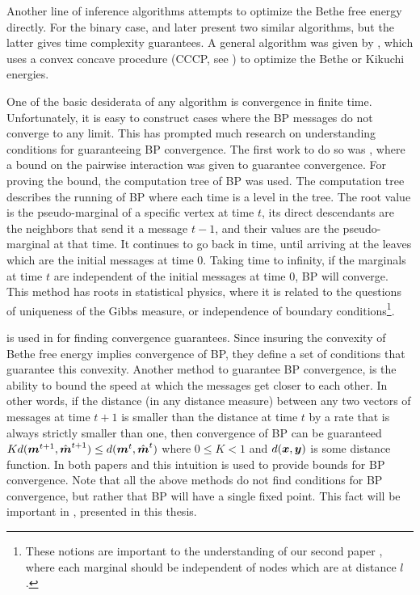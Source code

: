 Another line of inference algorithms attempts to optimize the Bethe free energy directly.
For the binary case,  \cite{welling2001belief} and later  \cite{shin2012complexity} present two similar algorithms, but the latter gives time complexity guarantees. A general algorithm was given by  \cite{yuille2002cccp}, which uses a convex concave procedure (CCCP, see  \cite{yuille2002concave}) to optimize the Bethe or Kikuchi energies.

One of the basic desiderata of any algorithm is convergence in finite time. Unfortunately, it is easy to construct cases where the
BP messages do not converge to any limit. This has prompted much research on understanding conditions for guaranteeing BP convergence.
The first work to do so was  \cite{tatikonda2002loopy}, where a bound on the pairwise interaction was given to guarantee convergence.
For proving the bound, the computation tree of BP was used.
The computation tree describes the running of BP where each time is a level in the tree.
The root value is the pseudo-marginal of a specific vertex at time $t$, its direct descendants are the neighbors that send it a message $t-1$, and their values are the pseudo-marginal at that time.
It continues to go back in time, until arriving at the leaves which are the initial messages at time $0$.
Taking time to infinity, if the marginals at time $t$ are independent of the initial messages at time $0$, BP will converge.
This method has roots in statistical physics, where it is related to the questions of uniqueness of the Gibbs measure, or independence of boundary conditions\footnote{These notions are important to the understanding of our second paper  \cite{heinemann2014inferning}, where each marginal should be independent of nodes which are at distance $l$.}.

 is used in  \cite{heskes2004uniqueness} for finding convergence guarantees.
Since insuring the convexity of Bethe free energy implies convergence of BP, they define a set of conditions that guarantee this convexity.
Another method to guarantee BP convergence, is the ability to bound the speed at which the messages get closer to each other.
In other words, if the distance (in any distance measure) between any two vectors of messages at time $t+1$ is smaller than the distance at time $t$ by a rate that is always strictly smaller than one, then convergence of BP can be guaranteed $ K d(\boldsymbol{m}^{t+1}, \hat{\boldsymbol{m}}^{t+1}) \leq d(\boldsymbol{m}^t, \hat{\boldsymbol{m}}^t)$ where $0\leq K<1$ and $d(\boldsymbol{x},\boldsymbol{y})$ is some distance function.
In both papers  \cite{mooij2007sufficient} and  \cite{roosta2008convergence} this intuition is used to provide bounds for BP convergence.
Note that all the above methods do not find conditions for BP convergence, but rather that BP will have a single fixed point.
This fact will be important in \cite{heinemann2012cannot}, presented in this thesis.

